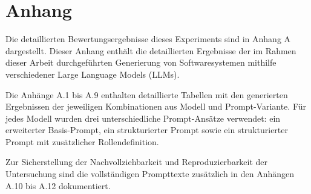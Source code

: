 

\chapter{Anhang}
\label{Ahnang}

Die detaillierten Bewertungsergebnisse dieses Experiments sind in Anhang A dargestellt.
Dieser Anhang enthält die detaillierten Ergebnisse der im Rahmen dieser Arbeit durchgeführten Generierung von Softwaresystemen mithilfe verschiedener Large Language Models (LLMs).

Die Anhänge A.1 bis A.9 enthalten detaillierte Tabellen mit den generierten Ergebnissen der jeweiligen Kombinationen aus Modell und Prompt-Variante. Für jedes Modell wurden drei unterschiedliche Prompt-Ansätze verwendet: ein erweiterter Basis-Prompt, ein strukturierter Prompt sowie ein strukturierter Prompt mit zusätzlicher Rollendefinition.

Zur Sicherstellung der Nachvollziehbarkeit und Reproduzierbarkeit der Untersuchung sind die vollständigen Prompttexte zusätzlich in den Anhängen A.10 bis A.12 dokumentiert.



















